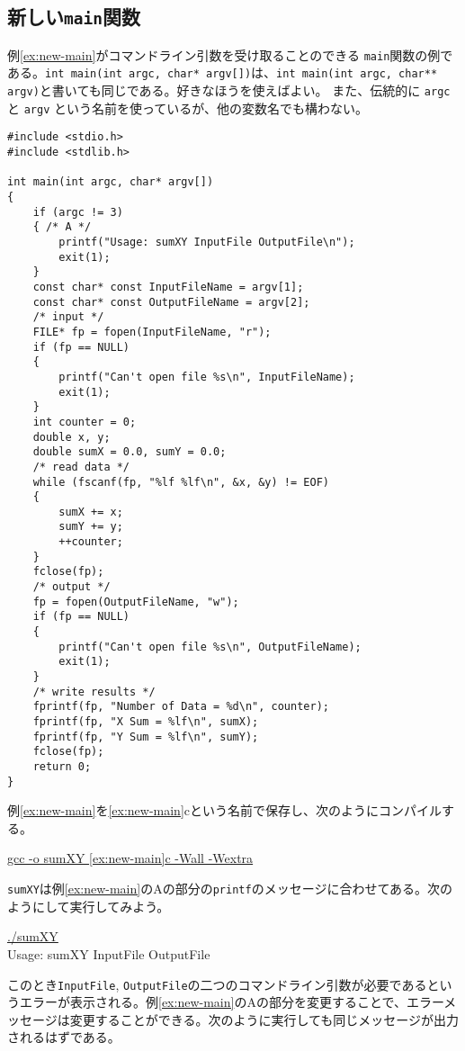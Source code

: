 \subsection{新しい\texttt{main}関数}

例\ref{ex:new-main}がコマンドライン引数を受け取ることのできる \texttt{main}関数の例である。\texttt{int main(int argc, char* argv[])}は、\texttt{int main(int argc, char** argv)}と書いても同じである。好きなほうを使えばよい。
また、伝統的に \texttt{argc} と \texttt{argv} という名前を使っているが、他の変数名でも構わない。
\begin{reidai}\label{ex:new-main}
    \begin{verbatim}
#include <stdio.h>
#include <stdlib.h>

int main(int argc, char* argv[])
{
    if (argc != 3)
    { /* A */
        printf("Usage: sumXY InputFile OutputFile\n");
        exit(1);
    }
    const char* const InputFileName = argv[1];
    const char* const OutputFileName = argv[2];
    /* input */
    FILE* fp = fopen(InputFileName, "r");
    if (fp == NULL)
    {
        printf("Can't open file %s\n", InputFileName);
        exit(1);
    }
    int counter = 0;
    double x, y;
    double sumX = 0.0, sumY = 0.0;
    /* read data */
    while (fscanf(fp, "%lf %lf\n", &x, &y) != EOF)
    {
        sumX += x;
        sumY += y;
        ++counter;
    }
    fclose(fp);
    /* output */
    fp = fopen(OutputFileName, "w");
    if (fp == NULL)
    {
        printf("Can't open file %s\n", OutputFileName);
        exit(1);
    }
    /* write results */
    fprintf(fp, "Number of Data = %d\n", counter);
    fprintf(fp, "X Sum = %lf\n", sumX);
    fprintf(fp, "Y Sum = %lf\n", sumY);
    fclose(fp);
    return 0;
}
\end{verbatim}
\end{reidai} \noindent
例\ref{ex:new-main}を\ref{ex:new-main}cという名前で保存し、次のようにコンパイルする。
\begin{commandline2}
    \prompt \underline{gcc -o sumXY \ref{ex:new-main}c -Wall -Wextra}
\end{commandline2} \noindent
\texttt{sumXY}は例\ref{ex:new-main}のAの部分の\texttt{printf}のメッセージに合わせてある。次のようにして実行してみよう。
\begin{commandline2}
    \prompt \underline{./sumXY}\\
    Usage: sumXY InputFile OutputFile
\end{commandline2} \noindent
このとき\texttt{InputFile}, \texttt{OutputFile}の二つのコマンドライン引数が必要であるというエラーが表示される。例\ref{ex:new-main}のAの部分を変更することで、エラーメッセージは変更することができる。次のように実行しても同じメッセージが出力されるはずである。
